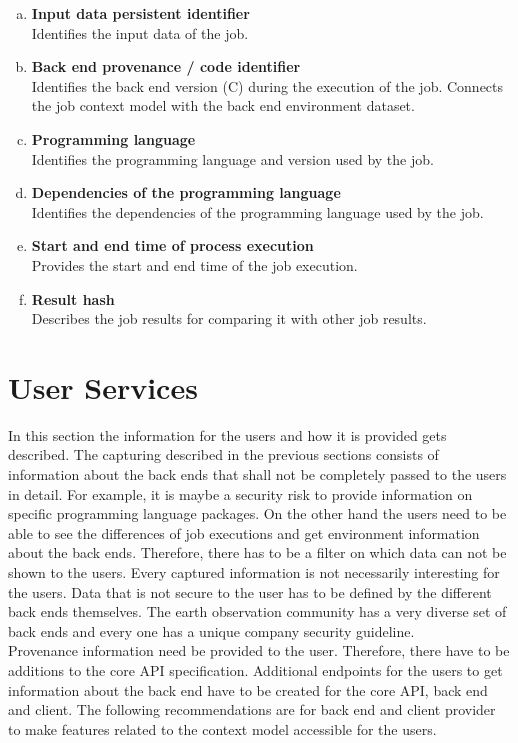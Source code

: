 \documentclass[draft,final]{vutinfth} %
\begin{document}
\begin{enumerate}[(a)]
	\item \textbf{Input data persistent identifier} \\
	Identifies the input data of the job.
	\item \textbf{Back end provenance / code identifier} \\
	Identifies the back end version (C) during the execution of the job. Connects the job context model with the back end environment dataset.
	\item \textbf{Programming language} \\
	Identifies the programming language and version used by the job.
	\item \textbf{Dependencies of the programming language} \\
	Identifies the dependencies of the programming language used by the job.
	\item \textbf{Start and end time of process execution} \\
	Provides the start and end time of the job execution.
	\item \textbf{Result hash} \\
	Describes the job results for comparing it with other job results.
\end{enumerate}

\section{User Services}\label{Design:User Interface}

In this section the information for the users and how it is provided gets described. The capturing described in the previous sections consists of information about the back ends that shall not be completely passed to the users in detail. For example, it is maybe a security risk to provide information on specific programming language packages. On the other hand the users need to be able to see the differences of job executions and get environment information about the back ends. Therefore, there has to be a filter on which data can not be shown to the users. Every captured information is not necessarily interesting for the users. Data that is not secure to the user has to be defined by the different back ends themselves. The earth observation community has a very diverse set of back ends and every one has a unique company security guideline.\\ 
Provenance information need be provided to the user. Therefore, there have to be additions to the core API specification. Additional endpoints for the users to get information about the back end have to be created for the core API, back end and client. The following recommendations are for back end and client provider to make features related to the context model accessible for the users.
\end{document}

